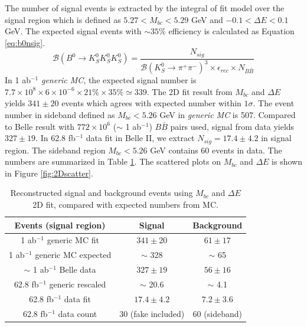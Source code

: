  The number of signal events is extracted by the integral of fit model over the signal region which is defined as $5.27 < M_{bc} < 5.29 $ GeV and $-0.1 < \Delta E < 0.1$ GeV.
 The expected signal events with $\sim 35\%$ efficiency is calculated as Equation \ref{eq:b0nsig}.
 \begin{equation}\label{eq:b0nsig}
 \mathcal{B}(B^0 \to K_S^0  K_S^0  K_S^0)=
 \frac{N_{sig}}{\mathcal{B}(K_S^0\to \pi^+\pi^-)^3\times
 	\epsilon_{rec}\times N_{B\bar{B}}}
 \end{equation}
 In 1 ab$^{-1}$ \textit{generic MC}, the expected signal number is $7.7\times 10^8 \times 6\times 10^{-6} \times 21\% \times 35\% \simeq 339$. The 2D fit result from $M_{bc}$ and $\Delta E$ yields $341\pm 20$ events which agrees with expected number within $1\sigma$. The event number in sideband defined as $M_{bc}<5.26$ GeV in \textit{generic MC} is 507. Compared to Belle result with $772\times 10^6$ ($\sim$ 1 ab$^{-1}$) $B\overline{B}$ pairs used, signal from data yields $327\pm 19$. In 62.8 fb$^{-1}$ data fit in Belle II, we extract $N_{sig} = 17.4 \pm 4.2$ in signal region. The sideband region $M_{bc}<5.26$ GeV contains 60 events in data. The numbers are summarized in Table \ref{tab:recoB}. The scattered plots on $M_{bc}$ and $\Delta E$ is shown in Figure \ref{fig:2Dscatter}.
 \begin{table}[htpb]
 	\centering 
 	\caption{Reconstructed signal and background events using $M_{bc}$ and $\Delta E$ 2D fit, compared with expected numbers from MC.}
 	\label{tab:recoB}
 	\begin{tabular}{|c|c|c|} 
 		\hline
 		Events (signal region) & Signal &  Background\\
 		\hline
 		1 ab$^{-1}$ generic MC fit & $341\pm 20$ & $61 \pm 17$\\
 		\hline
 		1 ab$^{-1}$ generic MC expected & $\sim$ 328 & $\sim$ 65\\
 		\hline
 		$\sim$ 1 ab$^{-1}$ Belle data &  $327\pm 19$ & $56 \pm 16$\\
 		\hline
 		62.8 fb$^{-1}$ generic rescaled & $\sim$ 20.6 & $\sim$ 4.1\\
 		\hline
 		62.8 fb$^{-1}$ data fit & $17.4\pm 4.2$ & $7.2\pm 3.6$\\
 		\hline
 		62.8 fb$^{-1}$ data count & 30 (fake included) & 60 (sideband)\\
 		
 		\hline
 	\end{tabular}
 \end{table}
 
